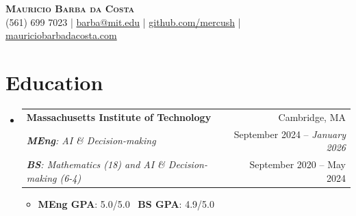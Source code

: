 \documentclass[letterpaper,10pt]{article} %
\makeatletter
\newcommand{\CVSubheading}[4]{
  \vspace{-2pt}\item
    \begin{tabular*}{0.97\textwidth}[t]{l@{\extracolsep{\fill}}r}
      \textbf{#1} & #2 \\
      \small#3 & \small #4 \\
    \end{tabular*}\vspace{-7pt}
}
\newcommand{\CVEducationSubheading}[6]{
  \vspace{-2pt}\item
    \begin{tabular*}{0.97\textwidth}[t]{l@{\extracolsep{\fill}}r}
      \textbf{#1} & #2 \\
      \small#3 & \small #4 \\
      \small#5 & \small #6
    \end{tabular*}\vspace{-7pt}
}
\newcommand{\CVSubHeadingListStart}{\begin{itemize}[leftmargin=0.5cm, label={}]}
\newcommand{\CVSubHeadingListEnd}{\end{itemize}}
\makeatother
\begin{document}

\begin{minipage}[c]{0.8\textwidth}
    \textbf{\Huge \scshape{Mauricio Barba da Costa}} \\ \vspace{1pt} 
    \small{(561) 699 7023} |
    \href{mailto:barba@mit.edu}{{barba@mit.edu}} |
    \href{https://github.com/mercush}{{github.com/mercush}} |
    \href{mauriciobarbadacosta.com}{{mauriciobarbadacosta.com}}
\end{minipage}




\section{Education}
  \CVSubHeadingListStart
    \CVEducationSubheading
      {{Massachusetts Institute of Technology}}{Cambridge, MA}
      {\emph{\textbf{MEng}: AI \& Decision-making}}{September 2024 -- \textit{January 2026}}
      {\emph{\textbf{BS}: Mathematics (18) and AI \& Decision-making (6-4)}}{September 2020 -- May 2024}
      \begin{itemize}
          \item \textbf{MEng GPA}{: 5.0/5.0} \, \textbf{BS GPA}{: 4.9/5.0}
      \end{itemize}
  \CVSubHeadingListEnd

\end{document}
